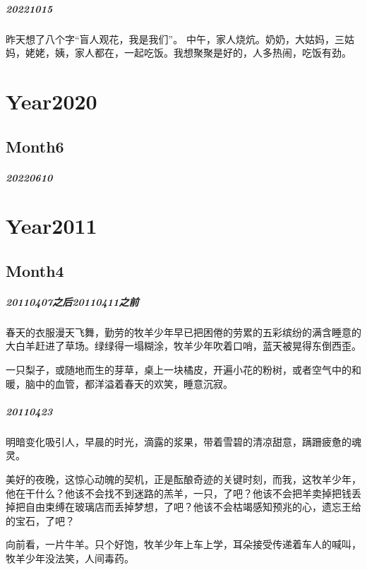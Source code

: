 \documentclass[UTF8]{Diaries}
\begin{document}
\paragraph{20221015}
昨天想了八个字“盲人观花，我是我们”。
中午，家人烧炕。奶奶，大姑妈，三姑妈，姥姥，姨，家人都在，一起吃饭。我想聚聚是好的，人多热闹，吃饭有劲。


\chapter{Year2020}
\section{Month6}
\paragraph{20220610}


\chapter{Year2011}

\section{Month4}
\paragraph{20110407之后20110411之前}

春天的衣服漫天飞舞，勤劳的牧羊少年早已把困倦的劳累的五彩缤纷的满含睡意的大白羊赶进了草场。绿绿得一塌糊涂，牧羊少年吹着口哨，蓝天被晃得东倒西歪。

一只梨子，或随地而生的芽草，桌上一块橘皮，开遍小花的粉树，或者空气中的和暖，脑中的血管，都洋溢着春天的欢笑，睡意沉寂。

\paragraph{20110423}
明暗变化吸引人，早晨的时光，滴露的浆果，带着雪碧的清凉甜意，蹒跚疲惫的魂灵。

美好的夜晚，这惊心动魄的契机，正是酝酿奇迹的关键时刻，而我，这牧羊少年，他在干什么？他该不会找不到迷路的羔羊，一只，了吧？他该不会把羊卖掉把钱丢掉把自由束缚在玻璃店而丢掉梦想，了吧？他该不会枯竭感知预兆的心，遗忘王给的宝石，了吧？

向前看，一片牛羊。只个好饱，牧羊少年上车上学，耳朵接受传递着车人的喊叫，牧羊少年没法笑，人间毒药。
\end{document}
